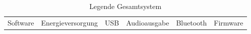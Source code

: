 \begin{table}[h]
	\centering
	\begin{tabular}{|c|c|c|c|c|c|} 
		\cellcolor{myviolett}Software & \cellcolor{myyellow}Energieversorgung & \cellcolor{myorange}USB & \cellcolor{mygreen}Audioausgabe & \cellcolor{myblue}Bluetooth & \cellcolor{myred}Firmware \\ 
	\end{tabular} 
	\caption{Legende Gesamtsystem}
	\label{legend_gesamtsystem}
\end{table}
